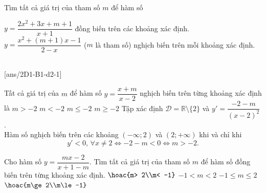 \begin{vd}
	Tìm tất cả giá trị của tham số $m$ để hàm số
	\begin{tasks}
		\task $ y = \dfrac{2x^2+3x+m+1}{x+1} $ đồng biến trên các khoảng xác định.
		\task $y=\dfrac{x^2+(m+1)x-1}{2-x}$ ($m$ là tham số) nghịch biến trên mỗi khoảng xác định.
	\end{tasks}
\end{vd}
 \\
\setcounter{ex}{0}
[ans/2D1-B1-d2-1]

\begin{ex}%
	Tất cả giá trị của $m$ để hàm số $y=\dfrac{x+m}{x-2}$ nghịch biến trên từng khoảng xác định là
	\choice
	{\True $m>-2$}
	{$m<-2$}
	{$m\leq -2$}
	{$m\geq -2$}
	\loigiai
	{Tập xác định $\mathscr{D}=\mathbb{R}\setminus \{2\}$ và $y'=\dfrac{-2-m}{(x-2)^2}$.\\
		Hàm số nghịch biến trên các khoảng $(-\infty;2)$ và $(2;+\infty)$ khi và chỉ khi
		\[y'<0,\, \forall x\neq 2\Leftrightarrow -2-m<0 \Leftrightarrow m>-2.\]}
\end{ex} 

\begin{ex}
	Cho hàm số $y=\dfrac{mx-2}{x+1-m}$. Tìm tất cả giá trị của tham số $m$ để hàm số đồng biến trên từng khoảng xác định.
	\choice
	{$\hoac{m> 2\\m< -1}$}
	{\True $-1<m<2$}
	{$-1\le m\le 2$}
	{$\hoac{m\ge 2\\m\le -1}$}
\end{ex} 

